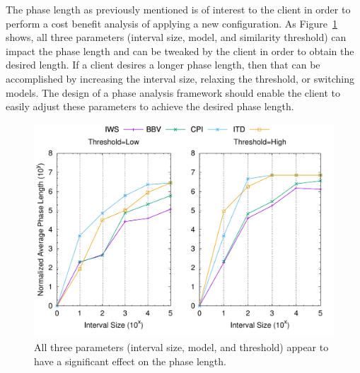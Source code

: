 The phase length as previously mentioned is of interest to the client in order to perform a cost benefit analysis of applying a new configuration. As Figure~\ref{fig:phaselen} shows, all three parameters (interval size, model, and similarity threshold) can impact the phase length and can be tweaked by the client in order to obtain the desired length. If a client desires a longer phase length, then that can be accomplished by increasing the interval size, relaxing the threshold, or switching models. The design of a phase analysis framework should enable the client to easily adjust these parameters to achieve the desired phase length. 


\begin{figure}[htbp]
  \begin{center}
\includegraphics[width=0.99\columnwidth]{figs/phaselenfixthreshold}
  \end{center}
  \caption{All three parameters (interval size, model, and threshold) appear to have a significant effect on the phase length.}
  \label{fig:phaselen}
\end{figure}


